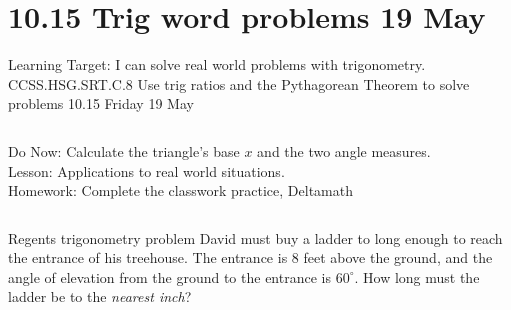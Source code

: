 \documentclass[onlytextwidth, aspectratio=169]{beamer}
\begin{document}
\section{10.15 Trig word problems \hfill 19 May \,}
\begin{frame}{Learning Target: I can solve real world problems with trigonometry.}
  {CCSS.HSG.SRT.C.8 Use trig ratios and the Pythagorean Theorem to solve problems \hfill \alert{10.15 Friday 19 May}}
  \begin{columns}
    Do Now: Calculate the triangle's base $x$ and the two angle measures. \\[0.5cm]
    Lesson: Applications to real world situations. \\[0.5cm]
    Homework: Complete the classwork practice, Deltamath \\
    \begin{flushright}
    \end{flushright}
  \end{columns}
\end{frame}

\begin{frame}{Regents trigonometry problem}
    David must buy a ladder to long enough to reach the entrance of his treehouse. The entrance is 8 feet above the ground, and the angle of elevation from the ground to the entrance is $60^\circ$. How long must the ladder be to the \emph{nearest inch}?
    \begin{flushright}
    \end{flushright}

\end{frame}
\end{document}
